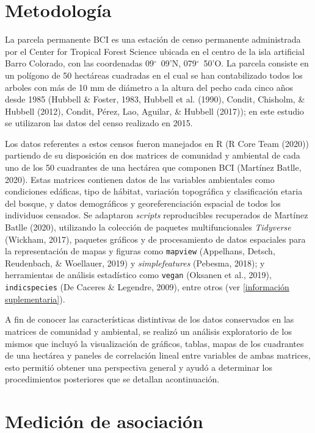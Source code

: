 \documentclass[11pt,]{article}
\begin{document}
\section{Metodología}\label{metodologuxeda}

La parcela permanente BCI es una estación de censo permanente
administrada por el Center for Tropical Forest Science ubicada en el
centro de la isla artificial Barro Colorado, con las coordenadas
09\(^\circ\)~09'N, 079\(^\circ\)~50'O. La parcela consiste en un
polígono de 50 hectáreas cuadradas en el cual se han contabilizado todos
los arboles con más de 10 mm de diámetro a la altura del pecho cada
cinco años desde 1985 (Hubbell \& Foster, 1983, Hubbell et al. (1990),
Condit, Chisholm, \& Hubbell (2012), Condit, Pérez, Lao, Aguilar, \&
Hubbell (2017)); en este estudio se utilizaron las datos del censo
realizado en 2015.

Los datos referentes a estos censos fueron manejados en R (R Core Team
(2020)) partiendo de su disposición en dos matrices de comunidad y
ambiental de cada uno de los 50 cuadrantes de una hectárea que componen
BCI (Martínez Batlle, 2020). Estas matrices contienen datos de las
variables ambientales como condiciones edáficas, tipo de hábitat,
variación topográfica y clasificación etaria del bosque, y datos
demográficos y georeferenciación espacial de todos los individuos
censados. Se adaptaron \emph{scripts} reproducibles recuperados de
Martínez Batlle (2020), utilizando la colección de paquetes
multifuncionales \emph{Tidyverse} (Wickham, 2017), paquetes gráficos y
de procesamiento de datos espaciales para la representación de mapas y
figuras como \texttt{mapview} (Appelhans, Detsch, Reudenbach, \&
Woellauer, 2019) y \emph{simplefeatures} (Pebesma, 2018); y herramientas
de análisis estadístico como \texttt{vegan} (Oksanen et al., 2019),
\texttt{indicspecies} (De Caceres \& Legendre, 2009), entre otros (ver
\ref{información suplementaria}).

A fin de conocer las características distintivas de los datos
conservados en las matrices de comunidad y ambiental, se realizó un
análisis exploratorio de los mismos que incluyó la visualización de
gráficos, tablas, mapas de los cuadrantes de una hectárea y paneles de
correlación lineal entre variables de ambas matrices, esto permitió
obtener una perspectiva general y ayudó a determinar los procedimientos
posteriores que se detallan acontinuación.

\section{Medición de asociación}\label{mediciuxf3n-de-asociaciuxf3n}
\end{document}
